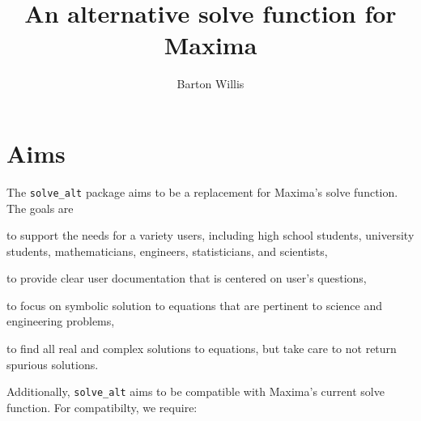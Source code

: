 \documentclass[]{scrartcl}
\title{An alternative solve function for Maxima}
\author{Barton Willis}
\newcommand{\altsolve}{\texttt{solve\_alt}}
\begin{document}
\maketitle

\section{Aims}

The \altsolve\/ package aims to be a replacement for Maxima's solve function. The goals are

\begin{alphalist}[]

\item to support the needs for a variety users, including high school students, university students, mathematicians, engineers, statisticians, and scientists,

\item to provide clear user documentation that is centered  on user's questions,

\item to focus on symbolic solution to equations that are pertinent to science and engineering problems,

\item to find all real and complex solutions to equations, but take care to not return spurious solutions.

\end{alphalist}
Additionally, \altsolve\/  aims to be compatible with Maxima's current solve function. For compatibilty, we require:
\end{document}
